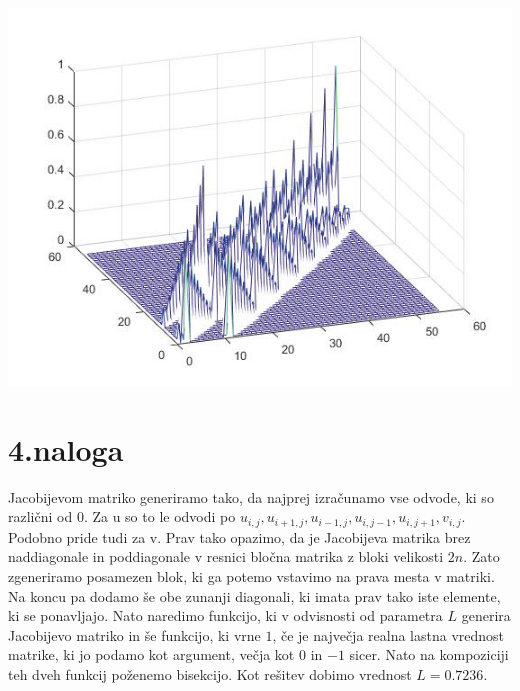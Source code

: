 \documentclass[11pt]{article} %
\begin{document}
\begin{centering}
\includegraphics[scale=0.4]{G1}
\end{centering}

\section{4.naloga}

Jacobijevom matriko generiramo tako, da najprej izračunamo vse odvode, ki so različni od $0$. Za u so to le odvodi po $u_{i,j},u_{i+1,j},u_{i-1,j},u_{i,j-1},u_{i,j+1},v_{i,j}$. Podobno pride tudi za v. Prav tako opazimo, da je Jacobijeva matrika brez naddiagonale in poddiagonale v resnici bločna matrika z bloki velikosti $2n$. Zato zgeneriramo posamezen blok, ki ga potemo vstavimo na prava mesta v matriki. Na koncu pa dodamo še obe zunanji diagonali, ki imata prav tako iste elemente, ki se ponavljajo. Nato naredimo funkcijo, ki v odvisnosti od parametra $L$ generira Jacobijevo matriko in še funkcijo, ki vrne $1$, če je največja realna lastna vrednost matrike, ki jo podamo kot argument, večja kot $0$ in $-1$ sicer. Nato na kompoziciji teh dveh funkcij poženemo bisekcijo. Kot rešitev dobimo vrednost $L=0.7236$.  
\end{document}
